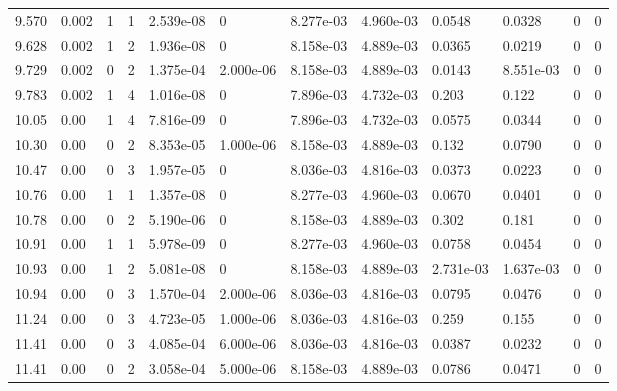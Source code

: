 \documentclass[preview]{standalone}
\begin{document}
{{{\begin{tabular}{L{1.2cm}C{1.2cm} C{0.3cm}C{0.5cm} C{1.4cm}C{1.4cm} C{1.4cm}C{1.4cm} C{1.6cm}C{1.6cm} C{1.6cm}C{1.6cm}}
  9.570  &  0.002  & 1     &  1 &  2.539e-08  & 0  &  8.277e-03&   4.960e-03& 0.0548 & 0.0328   &  0 & 0  \\ 
  9.628  &  0.002  & 1     &  2 &  1.936e-08  & 0  &  8.158e-03&   4.889e-03& 0.0365 & 0.0219   &  0 & 0  \\ 
  9.729  &  0.002  & 0     &  2 &  1.375e-04  & 2.000e-06  &  8.158e-03&   4.889e-03& 0.0143 & 8.551e-03   &  0 & 0  \\ 
  9.783  &  0.002  & 1     &  4 &  1.016e-08  & 0  &  7.896e-03&   4.732e-03& 0.203 & 0.122   &  0 & 0  \\ 
  10.05  &  0.00  & 1     &  4 &  7.816e-09  & 0  &  7.896e-03&   4.732e-03& 0.0575 & 0.0344   &  0 & 0  \\ 
  10.30  &  0.00  & 0     &  2 &  8.353e-05  & 1.000e-06  &  8.158e-03&   4.889e-03& 0.132 & 0.0790   &  0 & 0  \\ 
  10.47  &  0.00  & 0     &  3 &  1.957e-05  & 0  &  8.036e-03&   4.816e-03& 0.0373 & 0.0223   &  0 & 0  \\ 
  10.76  &  0.00  & 1     &  1 &  1.357e-08  & 0  &  8.277e-03&   4.960e-03& 0.0670 & 0.0401   &  0 & 0  \\ 
  10.78  &  0.00  & 0     &  2 &  5.190e-06  & 0  &  8.158e-03&   4.889e-03& 0.302 & 0.181   &  0 & 0  \\ 
  10.91  &  0.00  & 1     &  1 &  5.978e-09  & 0  &  8.277e-03&   4.960e-03& 0.0758 & 0.0454   &  0 & 0  \\ 
  10.93  &  0.00  & 1     &  2 &  5.081e-08  & 0  &  8.158e-03&   4.889e-03& 2.731e-03 & 1.637e-03   &  0 & 0  \\ 
  10.94  &  0.00  & 0     &  3 &  1.570e-04  & 2.000e-06  &  8.036e-03&   4.816e-03& 0.0795 & 0.0476   &  0 & 0  \\ 
  11.24  &  0.00  & 0     &  3 &  4.723e-05  & 1.000e-06  &  8.036e-03&   4.816e-03& 0.259 & 0.155   &  0 & 0  \\ 
  11.41  &  0.00  & 0     &  3 &  4.085e-04  & 6.000e-06  &  8.036e-03&   4.816e-03& 0.0387 & 0.0232   &  0 & 0  \\ 
  11.41  &  0.00  & 0     &  2 &  3.058e-04  & 5.000e-06  &  8.158e-03&   4.889e-03& 0.0786 & 0.0471   &  0 & 0  \\ 
\hline 
\end{tabular} 

}}}
\end{document}
